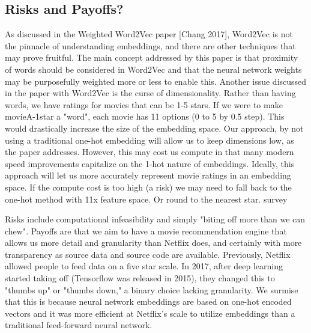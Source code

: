 \subsection{Risks and Payoffs?}

As discussed in the Weighted Word2Vec paper [Chang 2017], Word2Vec is not the pinnacle of understanding embeddings, and there are other techniques that may prove fruitful. The main concept addressed by this paper is that proximity of words should be considered in Word2Vec and that the neural network weights may be purposefully weighted more or less to enable this. Another issue discussed in the paper with Word2Vec is the curse of dimensionality. Rather than having words, we have ratings for movies that can be 1-5 stars. If we were to make movieA-1star a "word", each movie has 11 options (0 to 5 by 0.5 step). This would drastically increase the size of the embedding space. Our approach, by not using a traditional one-hot embedding will allow us to keep dimensions low, as the paper addresses. However, this may cost us compute in that many modern speed improvements capitalize on the 1-hot nature of embeddings. Ideally, this approach will let us more accurately represent movie ratings in an embedding space. If the compute cost is too high (a risk) we may need to fall back to the one-hot method with 11x feature space. Or round to the nearest star. survey

Risks include computational infeasibility and simply "biting off more than we can chew". Payoffs are that we aim to have a movie recommendation engine that allows us more detail and granularity than Netflix does, and certainly with more transparency as source data and source code are available. Previously, Netflix allowed people to feed data on a five star scale. In 2017, after deep learning started taking off (Tensorflow was released in 2015), they changed this to "thumbs up" or "thumbs down," a binary choice lacking granularity. We surmise that this is because neural network embeddings are based on one-hot encoded vectors and it was more efficient at Netflix's scale to utilize embeddings than a traditional feed-forward neural network.